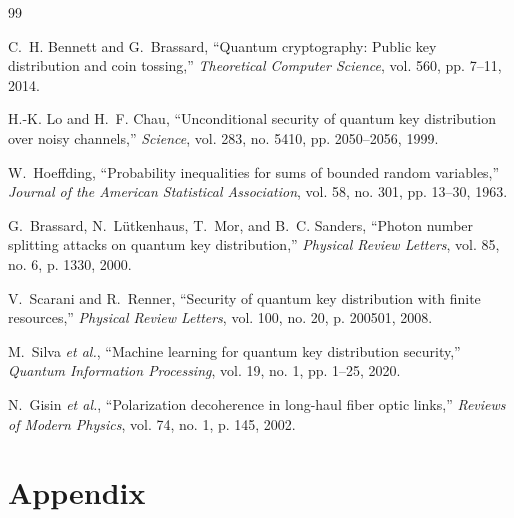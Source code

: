 \documentclass[journal,onecolumn,12pt,draftclsnofoot]{IEEEtran}
\begin{document}
\begin{thebibliography}{99}

C.~H. Bennett and G.~Brassard, ``Quantum cryptography: Public key distribution and coin tossing,'' \emph{Theoretical Computer Science}, vol. 560, pp. 7--11, 2014.

H.-K. Lo and H.~F. Chau, ``Unconditional security of quantum key distribution over noisy channels,'' \emph{Science}, vol. 283, no. 5410, pp. 2050--2056, 1999.

W.~Hoeffding, ``Probability inequalities for sums of bounded random variables,'' \emph{Journal of the American Statistical Association}, vol. 58, no. 301, pp. 13--30, 1963.

G.~Brassard, N.~L{\"u}tkenhaus, T.~Mor, and B.~C. Sanders, ``Photon number splitting attacks on quantum key distribution,'' \emph{Physical Review Letters}, vol. 85, no. 6, p. 1330, 2000.

V.~Scarani and R.~Renner, ``Security of quantum key distribution with finite resources,'' \emph{Physical Review Letters}, vol. 100, no. 20, p. 200501, 2008.

M.~Silva \emph{et al.}, ``Machine learning for quantum key distribution security,'' \emph{Quantum Information Processing}, vol. 19, no. 1, pp. 1--25, 2020.

N.~Gisin \emph{et al.}, ``Polarization decoherence in long-haul fiber optic links,'' \emph{Reviews of Modern Physics}, vol. 74, no. 1, p. 145, 2002.

\end{thebibliography}

\newpage

\section{Appendix}
\end{document}
